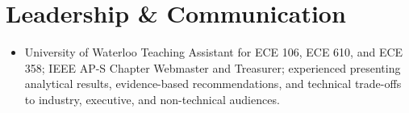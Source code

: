 \documentclass[letterpaper,11pt]{article}
\begin{document}
\section{Leadership \& Communication}

\begin{itemize}
    \item University of Waterloo Teaching Assistant for ECE 106, ECE 610, and ECE 358; IEEE AP-S Chapter Webmaster and Treasurer; experienced presenting analytical results, evidence-based recommendations, and technical trade-offs to industry, executive, and non-technical audiences.
\end{itemize}
\end{document}
